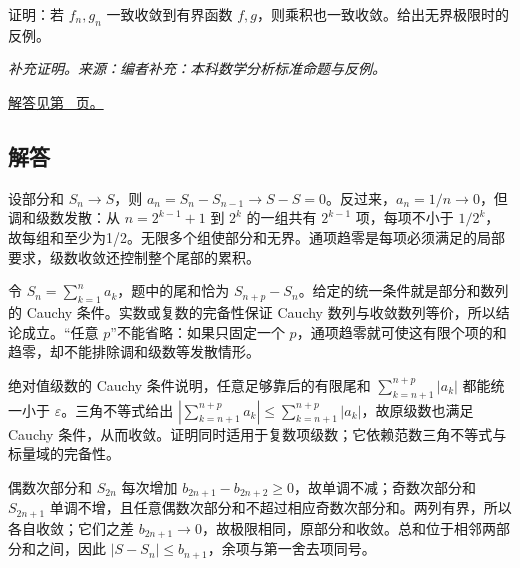 \documentclass[12pt,fontset=fandol]{ctexart}
\begin{document}
\begin{example}[一致收敛乘积所需的有界性]\label{ex:c29q20}
证明：若 $f_n,g_n$ 一致收敛到有界函数 $f,g$，则乘积也一致收敛。给出无界极限时的反例。
\par\textit{补充证明。来源：编者补充：本科数学分析标准命题与反例。}\par\hyperref[ans:c29q20]{解答见第~\pageref{ans:c29q20} 页。}
\end{example}
\subsection{解答}
\begin{solve}\label{ans:c29q1}
设部分和 $S_n\to S$，则 $a_n=S_n-S_{n-1}\to S-S=0$。反过来，$a_n=1/n\to0$，但调和级数发散：从 $n=2^{k-1}+1$ 到 $2^k$ 的一组共有 $2^{k-1}$ 项，每项不小于 $1/2^k$，故每组和至少为1/2。无限多个组使部分和无界。通项趋零是每项必须满足的局部要求，级数收敛还控制整个尾部的累积。
\end{solve}

\begin{solve}\label{ans:c29q2}
令 $S_n=\sum_{k=1}^na_k$，题中的尾和恰为 $S_{n+p}-S_n$。给定的统一条件就是部分和数列的 Cauchy 条件。实数或复数的完备性保证 Cauchy 数列与收敛数列等价，所以结论成立。“任意 $p$”不能省略：如果只固定一个 $p$，通项趋零就可使这有限个项的和趋零，却不能排除调和级数等发散情形。
\end{solve}

\begin{solve}\label{ans:c29q3}
绝对值级数的 Cauchy 条件说明，任意足够靠后的有限尾和 $\sum_{k=n+1}^{n+p}|a_k|$ 都能统一小于 $\varepsilon$。三角不等式给出 $|\sum_{k=n+1}^{n+p}a_k|\le\sum_{k=n+1}^{n+p}|a_k|$，故原级数也满足 Cauchy 条件，从而收敛。证明同时适用于复数项级数；它依赖范数三角不等式与标量域的完备性。
\end{solve}

\begin{solve}\label{ans:c29q4}
偶数次部分和 $S_{2n}$ 每次增加 $b_{2n+1}-b_{2n+2}\ge0$，故单调不减；奇数次部分和 $S_{2n+1}$ 单调不增，且任意偶数次部分和不超过相应奇数次部分和。两列有界，所以各自收敛；它们之差 $b_{2n+1}\to0$，故极限相同，原部分和收敛。总和位于相邻两部分和之间，因此 $|S-S_n|\le b_{n+1}$，余项与第一舍去项同号。
\end{solve}
\end{document}
